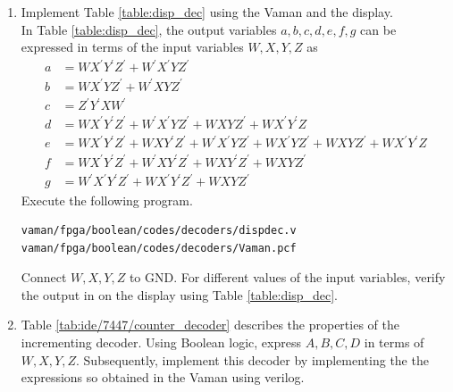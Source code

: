 \documentclass[journal,12pt,twocolumn]{IEEEtran}
\renewcommand\thesection{\arabic{section}}
\renewcommand\thesubsection{\thesection.\arabic{subsection}}
\begin{document}
\begin{enumerate}[label=\thesubsection.\arabic*.,ref=\thesubsection.\theenumi]
\item Implement  Table \ref{table:disp_dec} using the Vaman and the display.
\\
\solution In Table \ref{table:disp_dec}, the output variables   $a,b,c,d,e,f,g$ can be expressed
in terms of the input variables $W,X,Y,Z$ as
%
\begin{align}
\label{eq:vaman/fpga/boolean/disp_a}
a &= WX^{\prime}Y^{\prime}Z^{\prime}+W^{\prime}X^{\prime}YZ^{\prime}
\\
\label{eq:vaman/fpga/boolean/disp_b}
b &= WX^{\prime}YZ^{\prime}+W^{\prime}XYZ^{\prime}
\\
\label{eq:vaman/fpga/boolean/disp_c}
c &= {Z}^{\prime}{Y}^{\prime}X{W}^{\prime}
\\
d &= WX^{\prime}Y^{\prime}Z^{\prime}+W^{\prime}X^{\prime}YZ^{\prime}+WXYZ^{\prime}+WX^{\prime}Y^{\prime}Z
\label{eq:vaman/fpga/boolean/disp_d}
\\
e &= WX^{\prime}Y^{\prime}Z^{\prime}+WXY^{\prime}Z^{\prime}+W^{\prime}X^{\prime}YZ^{\prime}+WX^{\prime}YZ^{\prime}
	+WXYZ^{\prime}+WX^{\prime}Y^{\prime}Z
\label{eq:vaman/fpga/boolean/disp_e}
\\
f &= WX^{\prime}Y^{\prime}Z^{\prime}+W^{\prime}XY^{\prime}Z^{\prime}+WXY^{\prime}Z^{\prime}+WXYZ^{\prime}
\label{eq:vaman/fpga/boolean/disp_f}
\\
g &= W^{\prime}X^{\prime}Y^{\prime}Z^{\prime}+WX^{\prime}Y^{\prime}Z^{\prime}+WXYZ^{\prime}
\label{eq:vaman/fpga/boolean/disp_g}
\end{align}
%
%
Execute the following program.
\begin{lstlisting}
vaman/fpga/boolean/codes/decoders/dispdec.v
vaman/fpga/boolean/codes/decoders/Vaman.pcf
\end{lstlisting}
Connect $W, X, Y, Z$ to GND.  For different values of the input variables, verify the output
in on the display using Table \ref{table:disp_dec}.
\item Table  \ref{tab:ide/7447/counter_decoder} describes the properties of the incrementing decoder.
Using Boolean logic, express $A,B,C,D$ in terms of  $W,X,Y,Z$.  Subsequently, implement this decoder by implementing the the expressions so obtained in the Vaman using verilog.
\label{prob:counter_decoder}

\end{enumerate}
\end{document}
